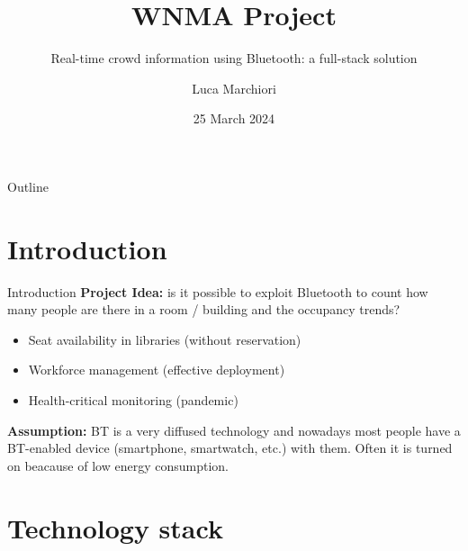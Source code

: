 \documentclass{beamer}
\title{WNMA Project}
\subtitle{Real-time crowd information using Bluetooth: a full-stack solution}
\author{Luca Marchiori}
\date{25 March 2024}
\begin{document}
\maketitle

\begin{frame}{Outline}
	\tableofcontents
\end{frame}


\section{Introduction}

\begin{frame}{Introduction}
	\textbf{Project Idea:} is it possible to exploit Bluetooth to count how many people are there in a room / building and the occupancy trends?
	\begin{itemize}
		\item Seat availability in libraries (without reservation)\vspace{.5em}
		\item Workforce management (effective deployment)\vspace{.5em}
		\item Health-critical monitoring (pandemic)\vspace{.5em}
	\end{itemize}

	\textbf{Assumption:} BT is a very diffused technology and nowadays most people have a BT-enabled device (smartphone, smartwatch, etc.) with them. Often it is turned on beacause of low energy consumption.

\end{frame}

\section{Technology stack}
\end{document}

